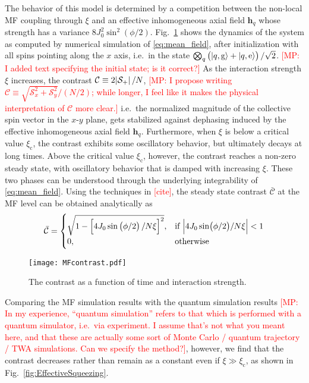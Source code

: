 \documentclass[aps,notitlepage,nofootinbib,11pt]{revtex4-1}
\renewcommand{\t}{\text} %
\newcommand{\p}[1]{\left(#1\right)} %
\renewcommand{\sp}[1]{\left[#1\right]} %
\renewcommand{\v}{\bm} %
\newcommand{\g}{\text{g}} %
\newcommand{\e}{\text{e}}
\newcommand{\1}{\hat{\mathds{1}}}
\newcommand{\note}[1]{\textcolor{red}{#1}}
\begin{document}
The behavior of this model is determined by a competition between the
non-local MF coupling through $\xi$ and an effective inhomogeneous
axial field $\v h_q$ whose strength has a variance
$8J_0^2\sin^2\p{\phi/2}$.  Fig.~\ref{fig:MFcontrast} shows the
dynamics of the system as computed by numerical simulation of
\eqref{eq:mean_field}, after initialization with all spins pointing
along the $x$ axis, i.e.~in the state
$\bigotimes_q\p{\ket{q,\g}+\ket{q,\e}}/\sqrt2$. \note{[MP: I added
  text specifying the initial state; is it correct?]}  As the
interaction strength $\xi$ increases, the contrast
$\mathcal C\equiv2\abs{\mathcal S_+}/N$, \note{[MP: I propose writing
  $\mathcal C\equiv\sqrt{\mathcal S_x^2+\mathcal S_y^2}/\p{N/2}$;
  while longer, I feel like it makes the physical interpretation of
  $\mathcal C$ more clear.]} i.e.~the normalized magnitude of the
collective spin vector in the $x$-$y$ plane, gets stabilized against
dephasing induced by the effective inhomogeneous axial field $\v h_q$.
Furthermore, when $\xi$ is below a critical value $\xi_{\t{c}}$, the
contrast exhibits some oscillatory behavior, but ultimately decays at
long times.  Above the critical value $\xi_{\t{c}}$, however, the
contrast reaches a non-zero steady state, with oscillatory behavior
that is damped with increasing $\xi$.  These two phases can be
understood through the underlying integrability of
\eqref{eq:mean_field}.  Using the techniques in \note{[cite]}, the
steady state contrast $\bar{\mathcal C}$ at the MF level can be
obtained analytically as
\begin{align}
  \bar{\mathcal C} =
  \begin{cases}
    \sqrt{1-\sp{4J_0\sin\p{\phi/2}/N\xi}^2},
    & \text{if}~ \abs{4J_0\sin(\phi/2)/N\xi} < 1 \\
    0,
    & \text{otherwise}
  \end{cases}
\end{align}

\begin{figure}
\centering
\texttt{[image: MFcontrast.pdf]}
\caption{
The contrast as a function of time and interaction strength.
}
\label{fig:MFcontrast}
\end{figure}

Comparing the MF simulation results with the quantum simulation
results \note{[MP: In my experience, ``quantum simulation'' refers to
  that which is performed with a quantum simulator, i.e.~via
  experiment.  I assume that's not what you meant here, and that these
  are actually some sort of Monte Carlo / quantum trajectory / TWA
  simulations.  Can we specify the method?]}, however, we find that
the contrast decreases rather than remain as a constant even if
$\xi\gg\xi_{\t{c}}$, as shown in Fig.~\ref{fig:EffectiveSqueezing}.
\end{document}

